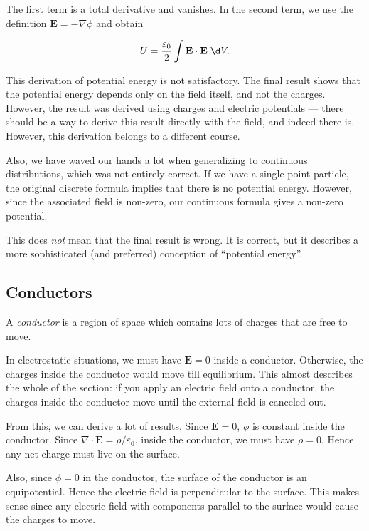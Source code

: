 \documentclass[a4paper]{article}
\begin{document}
The first term is a total derivative and vanishes. In the second term, we use the definition $\mathbf{E} = -\nabla \phi$ and obtain
\begin{prop}
  \[
    U = \frac{\varepsilon_0}{2}\int \mathbf{E}\cdot \mathbf{E} \;\d V.
  \]
\end{prop}
This derivation of potential energy is not satisfactory. The final result shows that the potential energy depends only on the field itself, and not the charges. However, the result was derived using charges and electric potentials --- there should be a way to derive this result directly with the field, and indeed there is. However, this derivation belongs to a different course.

Also, we have waved our hands a lot when generalizing to continuous distributions, which was not entirely correct. If we have a single point particle, the original discrete formula implies that there is no potential energy. However, since the associated field is non-zero, our continuous formula gives a non-zero potential.

This does \emph{not} mean that the final result is wrong. It is correct, but it describes a more sophisticated (and preferred) conception of ``potential energy''.

\subsection{Conductors}
\begin{defi}[Conductor]
  A \emph{conductor} is a region of space which contains lots of charges that are free to move.
\end{defi}

In electrostatic situations, we must have $\mathbf{E} = 0$ inside a conductor. Otherwise, the charges inside the conductor would move till equilibrium. This almost describes the whole of the section: if you apply an electric field onto a conductor, the charges inside the conductor move until the external field is canceled out.

From this, we can derive a lot of results. Since $\mathbf{E} = 0$, $\phi$ is constant inside the conductor. Since $\nabla \cdot \mathbf{E} = \rho/\varepsilon_0$, inside the conductor, we must have $\rho = 0$. Hence any net charge must live on the surface.

Also, since $\phi = 0$ in the conductor, the surface of the conductor is an equipotential. Hence the electric field is perpendicular to the surface. This makes sense since any electric field with components parallel to the surface would cause the charges to move.
\end{document}

